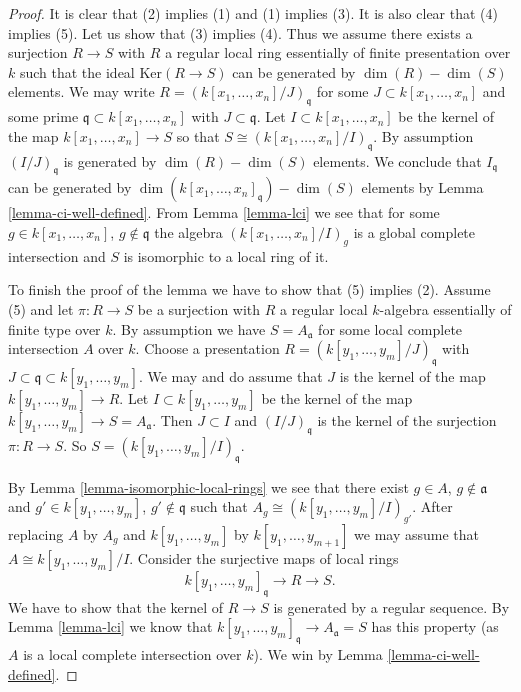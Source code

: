 \begin{proof}
It is clear that (2) implies (1) and (1) implies (3).
It is also clear that (4) implies (5). Let us show that (3) implies
(4). Thus we assume there exists a surjection
$R \to S$ with $R$ a regular local ring
essentially of finite presentation over $k$ such that the ideal
$\text{Ker}(R \to S)$ can be generated by $\dim(R) - \dim(S)$ elements.
We may write $R = (k[x_1, \ldots, x_n]/J)_{\mathfrak q}$
for some $J \subset k[x_1, \ldots, x_n]$ and
some prime $\mathfrak q \subset k[x_1, \ldots, x_n]$ with
$J \subset \mathfrak q$. Let $I \subset k[x_1, \ldots, x_n]$
be the kernel of the map $k[x_1, \ldots, x_n] \to S$ so that
$S \cong (k[x_1, \ldots, x_n]/I)_{\mathfrak q}$.
By assumption $(I/J)_{\mathfrak q}$ is generated by
$\dim(R) - \dim(S)$ elements. We conclude that
$I_{\mathfrak q}$ can be generated by
$\dim(k[x_1, \ldots, x_n]_{\mathfrak q}) - \dim(S)$ elements
by Lemma \ref{lemma-ci-well-defined}.
From Lemma \ref{lemma-lci} we see that for some
$g \in k[x_1, \ldots, x_n]$, $g \not \in \mathfrak q$
the algebra $(k[x_1, \ldots, x_n]/I)_g$ is a global
complete intersection and $S$ is isomorphic to
a local ring of it.

\medskip\noindent
To finish the proof of the lemma we have to show that (5) implies (2).
Assume (5) and let $\pi : R \to S$ be a surjection with $R$ a regular local
$k$-algebra essentially of finite type over $k$.
By assumption we have $S = A_{\mathfrak a}$ for some local
complete intersection $A$ over $k$.
Choose a presentation $R = (k[y_1, \ldots, y_m]/J)_{\mathfrak q}$
with $J \subset \mathfrak q \subset k[y_1, \ldots, y_m]$.
We may and do assume that $J$ is the kernel of the map
$k[y_1, \ldots, y_m] \to R$. Let $I \subset k[y_1, \ldots, y_m]$
be the kernel of the map $k[y_1, \ldots, y_m] \to S = A_{\mathfrak a}$.
Then $J \subset I$ and $(I/J)_{\mathfrak q}$ is the kernel of
the surjection $\pi : R \to S$. So
$S = (k[y_1, \ldots, y_m]/I)_{\mathfrak q}$.

\medskip\noindent
By Lemma \ref{lemma-isomorphic-local-rings} we see that there exist
$g \in A$, $g \not \in \mathfrak a$ and
$g' \in k[y_1, \ldots, y_m]$, $g' \not \in \mathfrak q$
such that $A_g \cong (k[y_1, \ldots, y_m]/I)_{g'}$.
After replacing $A$ by $A_g$ and $k[y_1, \ldots, y_m]$ by
$k[y_1, \ldots, y_{m + 1}]$ we may assume that
$A \cong k[y_1, \ldots, y_m]/I$. Consider the surjective
maps of local rings
$$
k[y_1, \ldots, y_m]_{\mathfrak q} \to R \to S.
$$
We have to show that the kernel of $R \to S$ is generated by
a regular sequence. By Lemma \ref{lemma-lci} we know that
$k[y_1, \ldots, y_m]_{\mathfrak q} \to A_{\mathfrak a} = S$
has this property (as $A$ is a local complete intersection over $k$).
We win by Lemma \ref{lemma-ci-well-defined}.
\end{proof}

